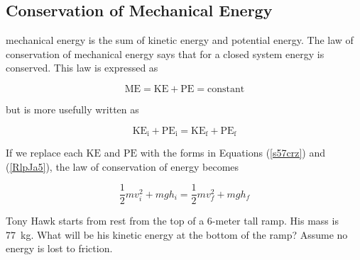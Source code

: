 \documentclass[main.tex]{subfiles}
\begin{document}
\clearpage

\subsection{Conservation of Mechanical Energy} \label{KRxiCV}

\Gls{mechanical energy} is the sum of kinetic energy and potential energy. The law of conservation of mechanical energy says that for a closed system energy is conserved. This law is expressed as

\begin{equation} \label{QyLUh5}
    \mathrm{ME} = \mathrm{KE} + \mathrm{PE} = \mathrm{constant}
\end{equation}

but is more usefully written as

\begin{equation} \label{yOUj22}
    \mathrm{KE_i} + \mathrm{PE_i} = \mathrm{KE_f} + \mathrm{PE_f}
\end{equation}


If we replace each $\mathrm{KE}$ and $\mathrm{PE}$ with the forms in Equations (\ref{s57crz}) and (\ref{RlpJa5}), the law of conservation of energy becomes

\begin{equation} \label{ZSmSin}
    \frac{1}{2} m v_i^2 + mgh_i  = 
    \frac{1}{2} m v_f^2 + mgh_f 
\end{equation}

\begin{example} \label{mUfgIz}
Tony Hawk starts from rest from the top of a 6-meter tall ramp. His mass is \SI{77}{kg}. What will be his kinetic energy at the bottom of the ramp? Assume no energy is lost to friction.
\end{example}

\begin{center}
\end{center}
\end{document}
